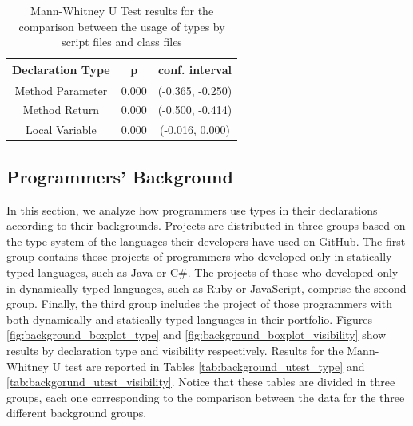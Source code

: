 \documentclass[preprint]{sigplanconf}
\begin{document}
\begin{table}[ht]
\centering{}%
\begin{tabular}{|c|c|c|}
\hline 
Declaration Type & p & conf. interval \\
\hline 
\hline 
Method Parameter              & 0.000	& (-0.365, -0.250) \\ \hline
Method Return                 & 0.000	& (-0.500, -0.414) \\ \hline
Local Variable                & 0.000	& (-0.016, 0.000)  \\ \hline
\hline 
\end{tabular}
\label{tab:script_utest_all}
\caption{Mann-Whitney U Test results for the comparison between the usage of types by script files and class files}
\end{table}

\subsection{Programmers' Background\label{res-background}}
In this section, we analyze how programmers use types in their declarations according to their backgrounds.
Projects are distributed in three groups based on the type system of the languages their developers have used on GitHub.
The first group contains those projects of programmers who developed only in statically typed languages, such as Java or C\#.
The projects of those who developed only in dynamically typed languages, such as Ruby or JavaScript, comprise the second group.
Finally, the third group includes the project of those programmers with both dynamically and statically typed languages in their portfolio.
Figures \ref{fig:background_boxplot_type} and \ref{fig:background_boxplot_visibility}  show results by declaration type and visibility respectively.
Results for the Mann-Whitney U test are reported in Tables \ref{tab:background_utest_type} and \ref{tab:backgorund_utest_visibility}.
Notice that these tables are divided in three groups, each one corresponding to the comparison between the data for the three different background groups.
\end{document}
